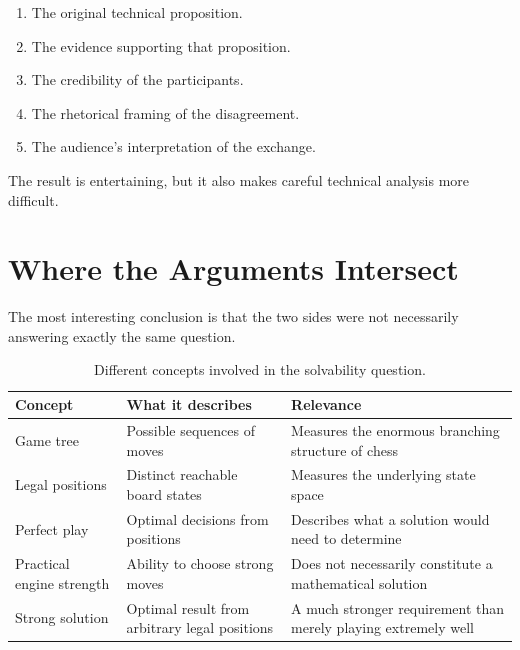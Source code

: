\documentclass[12pt,a4paper]{article}
\begin{document}
\begin{enumerate}
    \item The original technical proposition.
    \item The evidence supporting that proposition.
    \item The credibility of the participants.
    \item The rhetorical framing of the disagreement.
    \item The audience's interpretation of the exchange.
\end{enumerate}

The result is entertaining, but it also makes careful technical
analysis more difficult.


\section{Where the Arguments Intersect}

The most interesting conclusion is that the two sides were not
necessarily answering exactly the same question.

\begin{table}[ht]
\centering
\begin{tabularx}{\textwidth}{lXX}
\toprule
Concept & What it describes & Relevance \\
\midrule
Game tree &
Possible sequences of moves &
Measures the enormous branching structure of chess \\

Legal positions &
Distinct reachable board states &
Measures the underlying state space \\

Perfect play &
Optimal decisions from positions &
Describes what a solution would need to determine \\

Practical engine strength &
Ability to choose strong moves &
Does not necessarily constitute a mathematical solution \\

Strong solution &
Optimal result from arbitrary legal positions &
A much stronger requirement than merely playing extremely well \\
\bottomrule
\end{tabularx}
\caption{Different concepts involved in the solvability question.}
\end{table}
\end{document}
